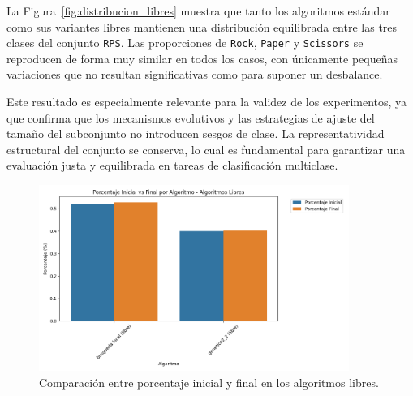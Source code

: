 La Figura~\ref{fig:distribucion_libres} muestra que tanto los algoritmos estándar como sus variantes libres 
mantienen una distribución equilibrada entre las tres clases del conjunto \texttt{RPS}.
Las proporciones de \texttt{Rock}, \texttt{Paper} y \texttt{Scissors} se reproducen de forma muy similar en todos los casos, 
con únicamente pequeñas variaciones que no resultan significativas como para suponer un desbalance.

Este resultado es especialmente relevante para la validez de los experimentos, ya que confirma que los mecanismos evolutivos 
y las estrategias de ajuste del tamaño del subconjunto no introducen sesgos de clase.
La representatividad estructural del conjunto se conserva, lo cual es fundamental para garantizar una evaluación justa y equilibrada en tareas de clasificación multiclase.


\begin{figure}[H]
\centering
\includegraphics[width=0.9\textwidth]{imagenes/evaluaciones/libres/porcentaje-inical-vs-final-por-algoritmo}
\caption{Comparación entre porcentaje inicial y final en los algoritmos libres.}
\label{fig:porcentaje_libres_1}
\end{figure}

